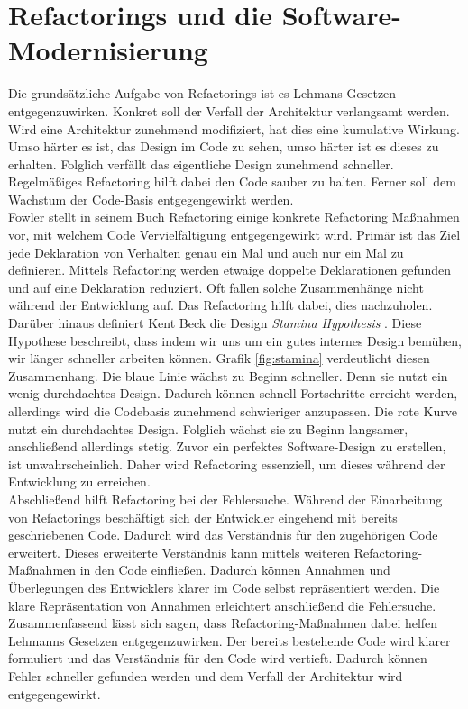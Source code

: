 \section{Refactorings und die Software-Modernisierung}
Die grundsätzliche Aufgabe von Refactorings ist es Lehmans Gesetzen entgegenzuwirken. Konkret soll der Verfall der Architektur verlangsamt werden. 
Wird eine Architektur zunehmend modifiziert, hat dies eine kumulative Wirkung. Umso härter es ist, das Design im Code zu sehen, umso härter ist es dieses zu erhalten. Folglich verfällt das eigentliche Design zunehmend schneller. Regelmäßiges Refactoring hilft dabei den Code sauber zu halten. Ferner soll dem Wachstum der Code-Basis entgegengewirkt werden. \cite{fowler_refactoring_2018}\cite{daniel_kramer_legacy-software_2020}\\
\newline
Fowler stellt in seinem Buch Refactoring \cite{fowler_refactoring_2018} einige konkrete Refactoring Maßnahmen vor, mit welchem Code Vervielfältigung entgegengewirkt wird. Primär ist das Ziel jede Deklaration von Verhalten genau ein Mal und auch nur ein Mal zu definieren. Mittels Refactoring werden etwaige doppelte Deklarationen gefunden und auf eine Deklaration reduziert. 
Oft fallen solche Zusammenhänge nicht während der Entwicklung auf. Das Refactoring hilft dabei, dies nachzuholen. \\
\newline
Darüber hinaus definiert Kent Beck die Design \textit{Stamina Hypothesis} \cite{fowler_refactoring_2018}. 
Diese Hypothese beschreibt, dass indem wir uns um ein gutes internes Design bemühen, wir länger schneller arbeiten können. 
Grafik \ref{fig:stamina} verdeutlicht diesen Zusammenhang. Die blaue Linie wächst zu Beginn schneller. Denn sie nutzt ein wenig durchdachtes Design. Dadurch können schnell Fortschritte erreicht werden, allerdings wird die Codebasis zunehmend schwieriger anzupassen. Die rote Kurve nutzt ein durchdachtes Design. Folglich wächst sie zu Beginn langsamer, anschließend allerdings stetig.
Zuvor ein perfektes Software-Design zu erstellen, ist unwahrscheinlich. Daher wird Refactoring essenziell, um dieses während der Entwicklung zu erreichen.\\
\newline
Abschließend hilft Refactoring bei der Fehlersuche. Während der Einarbeitung von Refactorings beschäftigt sich der Entwickler eingehend mit bereits geschriebenen Code. Dadurch wird das Verständnis für den zugehörigen Code erweitert. Dieses erweiterte Verständnis kann mittels weiteren Refactoring-Maßnahmen in den Code einfließen. Dadurch können Annahmen und Überlegungen des Entwicklers klarer im Code selbst repräsentiert werden. Die klare Repräsentation von Annahmen erleichtert anschließend die Fehlersuche.
Zusammenfassend lässt sich sagen, dass Refactoring-Maßnahmen dabei helfen Lehmanns Gesetzen entgegenzuwirken. Der bereits bestehende Code wird klarer formuliert und das Verständnis für den Code wird vertieft. Dadurch können Fehler schneller gefunden werden und dem Verfall der Architektur wird entgegengewirkt.

